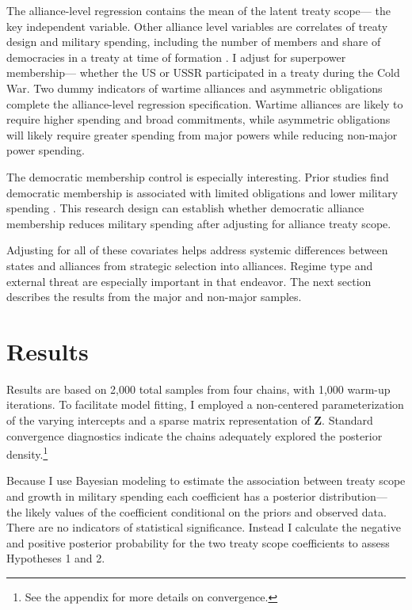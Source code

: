 \documentclass[12pt]{article}
\begin{document}
The alliance-level regression contains the mean of the latent treaty scope--- the key independent variable. 
Other alliance level variables are correlates of treaty design and military spending, including the number of members and share of democracies in a treaty at time of formation \citep{Chibaetal2015}.
I adjust for superpower membership--- whether the US or USSR participated in a treaty during the Cold War. 
Two dummy indicators of wartime alliances and asymmetric obligations \citep{Leedsetal2002} complete the alliance-level regression specification. 
Wartime alliances are likely to require higher spending and broad commitments, while asymmetric obligations will likely require greater spending from major powers while reducing non-major power spending. 


The democratic membership control is especially interesting. 
Prior studies find democratic membership is associated with limited obligations \citep{Chibaetal2015} and lower military spending \citep{DigiuseppePoast2016}.
This research design can establish whether democratic alliance membership reduces military spending after adjusting for alliance treaty scope. 


Adjusting for all of these covariates helps address systemic differences between states and alliances from strategic selection into alliances. 
Regime type and external threat are especially important in that endeavor. 
The next section describes the results from the major and non-major samples.
 

\section{Results}


Results are based on 2,000 total samples from four chains, with 1,000 warm-up iterations. 
To facilitate model fitting, I employed a non-centered parameterization of the varying intercepts and a sparse matrix representation of \textbf{Z}. 
Standard convergence diagnostics indicate the chains adequately explored the posterior density.\footnote{See the appendix for more details on convergence.} 


Because I use Bayesian modeling to estimate the association between treaty scope and growth in military spending each coefficient has a posterior distribution--- the likely values of the coefficient conditional on the priors and observed data.
There are no indicators of statistical significance. 
Instead I calculate the negative and positive posterior probability for the two treaty scope coefficients to assess Hypotheses 1 and 2.
\end{document}
